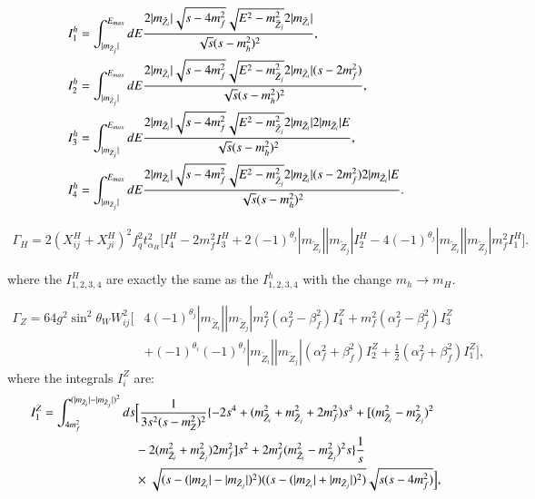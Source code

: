\documentclass[final,3p,times]{elsarticle}
\begin{document}
\begin{align}
I_{1}^h &= \int_{|m_{\tilde{Z}_j}|}^{E_{max}} dE {2|m_{\tilde{Z}_i}|\sqrt{s-4 m_{f}^2} \sqrt{E^2 - m_{\tilde{Z}_j}^2}2|m_{\tilde{Z}_i}| \over \sqrt{s}(s-m_{h}^2)^2}, \\
I_{2}^h &= \int_{|m_{\tilde{Z}_j}|}^{E_{max}} dE {2|m_{\tilde{Z}_i}|\sqrt{s-4 m_{f}^2} \sqrt{E^2 - m_{\tilde{Z}_j}^2}2| m_{\tilde{Z}_i}| (s - 2 m_{f}^2) \over \sqrt{s}(s-m_{h}^2)^2}, \\
I_{3}^h &= \int_{|m_{\tilde{Z}_j}|}^{E_{max}} dE {2|m_{\tilde{Z}_i}|\sqrt{s-4 m_{f}^2} \sqrt{E^2 - m_{\tilde{Z}_j}^2}2|m_{\tilde{Z}_i}| 2|m_{\tilde{Z}_i}|E \over \sqrt{s}(s-m_{h}^2)^2}, \\
I_{4}^h &= \int_{|m_{\tilde{Z}_j}|}^{E_{max}} dE {2|m_{\tilde{Z}_i}|\sqrt{s-4 m_{f}^2} \sqrt{E^2 - m_{\tilde{Z}_j}^2}2|m_{\tilde{Z}_i}| (s - 2 m_{f}^2) 2|m_{\tilde{Z}_i}|E \over \sqrt{s}(s-m_{h}^2)^2}.
\end{align}

\begin{equation}
\begin{aligned}
\Gamma_H = 2(X_{ij}^H + X_{ji}^H)^2 f_{q}^2 t_{\alpha_H}^2 \Big[I_{4}^H - 2m_{f}^2 I_{3}^H + 2(-1)^{\theta_j}|m_{\tilde{Z}_i}||m_{\tilde{Z}_j}|I_{2}^H - 4(-1)^{\theta_j}|m_{\tilde{Z}_i}||m_{\tilde{Z}_j}|m_{f}^2 I_{1}^H\Big].
\end{aligned}
\end{equation}

where the $I_{1,2,3,4}^H$ are exactly the same as the $I_{1,2,3,4}^h$ with the change $m_{h} \rightarrow m_{H}$.

\begin{equation}
\begin{aligned}
\Gamma_Z = 64 g^2 \sin^2 \theta_W W_{ij}^2 \Big[ & 4(-1)^{\theta_j}|m_{\tilde{Z}_i}||m_{\tilde{Z}_j}|m_{f}^2(\alpha_{f}^2 - \beta_{f}^2)I_{4}^Z + m_{f}^2(\alpha_{f}^2 - \beta_{f}^2)I_{3}^Z \\ & + (-1)^{\theta_i}(-1)^{\theta_j}|m_{\tilde{Z}_i}||m_{\tilde{Z}_j}|(\alpha_{f}^2 + \beta_{f}^2)I_{2}^Z + \frac{1}{2}(\alpha_{f}^2 + \beta_{f}^2)I_{1}^Z\Big],
\end{aligned}
\end{equation}
where the integrals $I_{i}^Z$ are:
\begin{equation}
\begin{aligned}
I_{1}^Z = \int_{4m_{f}^2}^{(|m_{\tilde{Z}_i}| - |m_{\tilde{Z}_j}|)^2} ds & \Big[ {1 \over 3 s^2 (s-m_{Z}^2)^2} \{-2s^4 + (m_{\tilde{Z}_i}^2 + m_{\tilde{Z}_j}^2 + 2m_{f}^2)s^3 + [(m_{\tilde{Z}_i}^2 - m_{\tilde{Z}_j}^2)^2 \\ & - 2(m_{\tilde{Z}_i}^2 + m_{\tilde{Z}_j}^2)2m_{f}^2]s^2 + 2m_{f}^2 (m_{\tilde{Z}_i}^2 - m_{\tilde{Z}_j}^2)^2 s\}{1 \over s} \\ & \times \sqrt{(s-(|m_{\tilde{Z}_i}|-|m_{\tilde{Z}_j}|)^2)((s-(|m_{\tilde{Z}_i}|+|m_{\tilde{Z}_j}|)^2)}\sqrt{s(s-4m_{f}^2)} \Big],
\end{aligned}
\end{equation}
\end{document}
